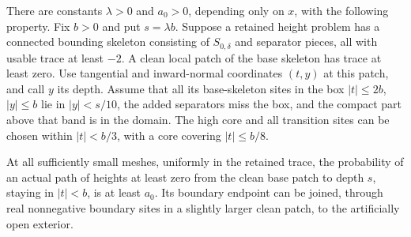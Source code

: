 \begin{lemma}\label{lem:boundary-attachment}
There are constants $\lambda>0$ and $a_0>0$, depending only on $x$,
with the following property.  Fix $b>0$ and put $s=\lambda b$.
Suppose a retained height problem has a connected bounding skeleton
consisting of $S_{0,\delta}$ and separator pieces, all with usable
trace at least $-2$.  A clean local patch of the base skeleton has
trace at least zero.  Use tangential and inward-normal coordinates
$(t,y)$ at this patch, and call $y$ its depth.  Assume that all its
base-skeleton sites in the box $|t|\le 2b$, $|y|\le b$ lie in
$|y|<s/10$, the added separators miss the box, and the compact part
above that band is in the domain.  The high core and all transition
sites can be chosen within $|t|<b/3$, with a core covering $|t|\le b/8$.

At all sufficiently small meshes, uniformly in the retained trace,
the probability of an actual
path of heights at least zero from the clean base patch to depth
$s$, staying in $|t|<b$, is at least $a_0$.  Its boundary endpoint
can be joined, through real nonnegative boundary sites in a slightly
larger clean patch, to the artificially open exterior.
\end{lemma}

